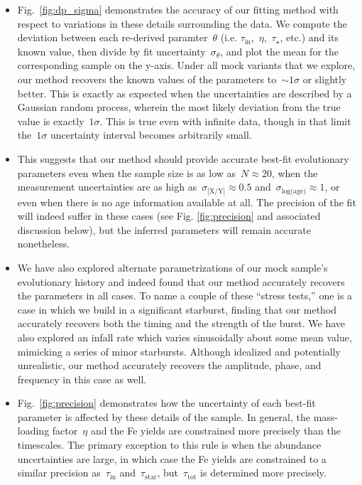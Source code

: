 \documentclass[ms.tex]{subfiles}
\begin{document}
\begin{itemize}
	\item Fig.~\ref{fig:dp_sigma} demonstrates the accuracy of our fitting
	method with respect to variations in these details surrounding the data.
	We compute the deviation between each re-derived paramter~$\theta$ (i.e.
	$\tau_\text{in}$,~$\eta$,~$\tau_\star$, etc.) and its known value, then
	divide by fit uncertainty~$\sigma_\theta$, and plot the mean for the
	corresponding sample on the y-axis.
	Under all mock variants that we explore, our method recovers the known
	values of the parameters to~$\sim1\sigma$ or slightly better.
	This is exactly as expected when the uncertainties are described by a
	Gaussian random process, wherein the most likely deviation from the true
	value is exactly~$1\sigma$.
	This is true even with infinite data, though in that limit the~$1\sigma$
	uncertainty interval becomes arbitrarily small.

	\item This suggests that our method should provide accurate best-fit
	evolutionary parameters even when the sample size is as low
	as~$N \approx 20$, when the measurement uncertainties are as high
	as~$\sigma_\text{[X/Y]} \approx 0.5$ and~$\sigma_\text{log(age)} \approx 1$,
	or even when there is no age information available at all.
	The precision of the fit will indeed suffer in these cases (see Fig.
	\ref{fig:precision} and associated discussion below), but the inferred
	parameters will remain accurate nonetheless.

	\item We have also explored alternate parametrizations of our mock sample's
	evolutionary history and indeed found that our method accurately recovers
	the parameters in all cases.
	To name a couple of these ``stress tests,'' one is a case in which we build
	in a significant starburst, finding that our method accurately recovers
	both the timing and the strength of the burst.
	We have also explored an infall rate which varies sinusoidally about some
	mean value, mimicking a series of minor starbursts.
	Although idealized and potentially unrealistic, our method accurately
	recovers the amplitude, phase, and frequency in this case as well.

	\item Fig.~\ref{fig:precision} demonstrates how the uncertainty of each
	best-fit parameter is affected by these details of the sample.
	In general, the mass-loading factor~$\eta$ and the Fe yields are
	constrained more precisely than the timescales.
	The primary exception to this rule is when the abundance uncertainties are
	large, in which case the Fe yields are constrained to a similar precision
	as~$\tau_\text{in}$ and~$\tau_\text{star}$, but~$\tau_\text{tot}$ is
	determined more precisely.


\end{itemize}
\end{document}
